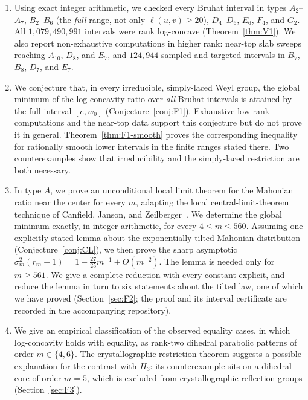 \documentclass[11pt]{amsart}
\theoremstyle{plain}
\theoremstyle{definition}
\theoremstyle{remark}
\begin{document}
\begin{enumerate}[label=(\roman*)]
\item Using exact integer arithmetic, we checked every Bruhat interval in
types $A_2$--$A_7$, $B_2$--$B_6$ (the \emph{full} range, not only
$\ell(u,v)\ge 20$), $D_4$--$D_6$, $E_6$, $F_4$, and $G_2$. All
$1{,}079{,}490{,}991$ intervals were rank log-concave
(Theorem~\ref{thm:V1}). We also report non-exhaustive computations in
higher rank: near-top slab sweeps reaching $A_{10}$, $D_8$, and $E_7$, and
$124{,}944$ sampled and targeted intervals in $B_7$, $B_8$, $D_7$, and
$E_7$.

\item We conjecture that, in every irreducible, simply-laced Weyl group,
the global minimum of the log-concavity ratio over \emph{all} Bruhat
intervals is attained by the full interval $[e,w_0]$
(Conjecture~\ref{conj:F1}). Exhaustive low-rank computations and the
near-top data support this conjecture but do not prove it in general.
Theorem~\ref{thm:F1-smooth} proves the corresponding inequality for
rationally smooth lower intervals in the finite ranges stated there. Two
counterexamples show that irreducibility and the simply-laced restriction
are both necessary.

\item In type $A$, we prove an unconditional local limit theorem for the
Mahonian ratio near the center for every $m$, adapting the local
central-limit-theorem technique of Canfield, Janson, and
Zeilberger~\cite{cjz2011}. We determine the global minimum exactly, in
integer arithmetic, for every $4\le m\le560$. Assuming one explicitly
stated lemma about the exponentially tilted Mahonian distribution
(Conjecture~\ref{conj:CL}), we then prove the sharp asymptotic
$\sigma_m^2(r_m-1)=1-\tfrac{27}{25}m^{-1}+O(m^{-2})$. The lemma is needed
only for $m\ge561$. We give a complete reduction with every constant
explicit, and reduce the lemma in turn to six statements about the tilted law, one of which we have proved
(Section~\ref{sec:F2}; the proof and its interval certificate are recorded
in the accompanying repository).

\item We give an empirical classification of the observed equality cases,
in which log-concavity holds with equality, as rank-two dihedral parabolic
patterns of order $m\in\{4,6\}$. The crystallographic restriction theorem
suggests a possible explanation for the contrast with $H_3$: its
counterexample sits on a dihedral core of order $m=5$, which is excluded
from crystallographic reflection groups (Section~\ref{sec:F3}).
\end{enumerate}
\end{document}
